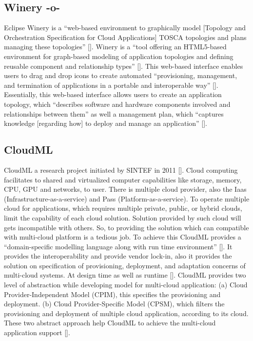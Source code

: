 \subsection{Winery -o-}

Eclipse Winery is a ``web-based environment to graphically model
[Topology and Orchestration Specification for Cloud Applications]
TOSCA topologies and plans managing these
topologies'' [\cite{www-winery}]. Winery is a ``tool offering an
HTML5-based environment for graph-based modeling of application
topologies and defining reusable component and relationship
types'' [\cite{winery-paper-2013}]. This web-based interface enables
users to drag and drop icons to create automated ``provisioning,
management, and termination of applications in a portable and
interoperable way'' [\cite{winery-paper-2013}].  Essentially, this
web-based interface allows users to create an application topology,
which ``describes software and hardware components involved and
relationships between them'' as well a management plan, which
``captures knowledge [regarding how] to deploy and manage an
application'' [\cite{winery-paper-2013}].


     

\subsection{CloudML}
                                                            
CloudML a research project initiated by SINTEF in 2011
 [\cite{www-cloudml}]. Cloud computing facilitates to shared and
virtualized computer capabilities like storage, memory, CPU, GPU and
networks, to user. There is multiple cloud provider, also the Iaas
(Infrastructure-as-a-service) and Pass (Platform-as-a-service). To
operate multiple cloud for applications, which requires multiple
private, public, or hybrid clouds, limit the capability of each cloud
solution.  Solution provided by such cloud will gets incompatible with
others. So, to providing the solution which can compatible with
multi-cloud platform is a tedious job. To achieve this CloudML
provides a ``domain-specific modelling language along with run time
environment'' [\cite{www-cloudml}]. It provides the interoperability and
provide vendor lock-in, also it provides the solution on specification
of provisioning, deployment, and adaptation concerns of multi-cloud
systems. At design time as well as runtime [\cite{www-cloudml}].
CloudML provides two level of abstraction while developing model for
multi-cloud application: (a) Cloud Provider-Independent Model (CPIM),
this specifies the provisioning and deployment.  (b) Cloud
Provider-Specific Model (CPSM), which filters the provisioning and
deployment of multiple cloud application, according to its cloud.
These two abstract approach help CloudML to achieve the multi-cloud
application support [\cite{www-cloudmlwiki}].

